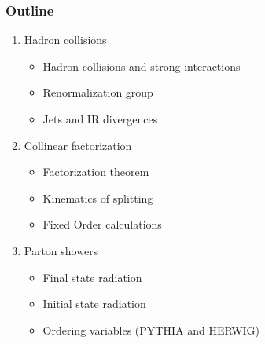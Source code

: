 \documentclass[aspectratio=43]{beamer}
\begin{document}
\begin{frame}

	\frametitle{Outline}
	
	\begin{enumerate}
		\item {\color{blue}Hadron collisions}
		\begin{itemize}
			\item Hadron collisions and strong interactions
			\item Renormalization group
			\item Jets and IR divergences
		\end{itemize}
		\item {\color{blue}Collinear factorization}
		\begin{itemize}
			\item Factorization theorem
			\item Kinematics of splitting
			\item Fixed Order calculations
		\end{itemize}
		\item {\color{blue}Parton showers}
		\begin{itemize}
			\item Final state radiation
			\item Initial state radiation
			\item Ordering variables (PYTHIA and HERWIG)
		\end{itemize}
	\end{enumerate}
	
\end{frame}

\begin{frame}


\end{frame}
\end{document}

